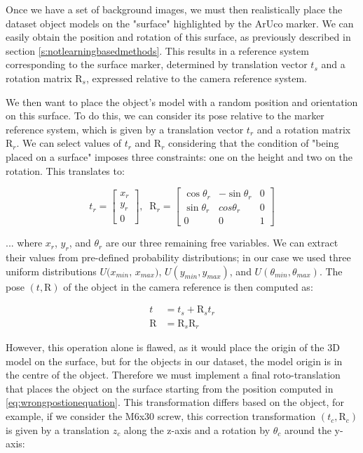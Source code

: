 Once we have a set of background images, we must then realistically place the dataset object models on the "surface" highlighted by the ArUco marker. We can easily obtain the position and rotation of this surface, as previously described in section \ref*{s:notlearningbasedmethods}. This results in a reference system corresponding to the surface marker, determined by translation vector $t_s$ and a rotation matrix $\text{R}_s$, expressed relative to the camera reference system.

We then want to place the object's model with a random position and orientation on this surface. To do this, we can consider its pose relative to the marker reference system, which is given by a translation vector $t_r$ and a rotation matrix $\text{R}_r$. We can select values of $t_r$ and $\text{R}_r$ considering that the condition of "being placed on a surface" imposes three constraints: one on the height and two on the rotation. This translates to:

\begin{equation*}
    t_r = 
    \begin{bmatrix}
        x_r\\y_r\\0
    \end{bmatrix}
    ,\; \; \text{R}_r =
    \begin{bmatrix}
        \cos \theta_r & - \sin \theta_r & 0 \\
        \sin \theta_r & cos \theta_r & 0 \\
        0 & 0 & 1
    \end{bmatrix}
\end{equation*}

... where $x_r$, $y_r$, and  $\theta_r$ are our three remaining free variables. We can extract their values from pre-defined probability distributions; in our case we used three uniform distributions $U(x_{min}$, $x_{max})$, $U(y_{min}, y_{max})$, and $U(\theta_{min}, \theta_{max})$. The pose $(t, \text{R})$ of the object in the camera reference is then computed as:

\begin{align}
    t &= t_s + \text{R}_s t_r \label{eq:wrongpostionequation} \\
    \text{R} &= \text{R}_s \text{R}_r \nonumber
\end{align}

However, this operation alone is flawed, as it would place the origin of the 3D model on the surface, but for the objects in our dataset, the model origin is in the centre of the object. Therefore we must implement a final roto-translation that places the object on the surface starting from the position computed in \ref*{eq:wrongpostionequation}. This transformation differs based on the object, for example, if we consider the M6x30 screw, this correction transformation $(t_c, \text{R}_c)$ is given by a translation $z_c$ along the z-axis and a rotation by $\theta_c$ around the y-axis:

